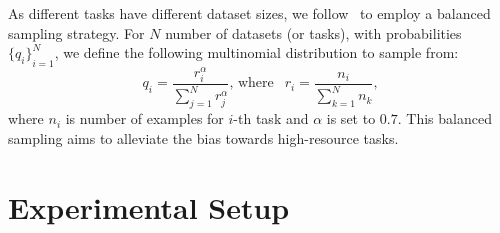 \documentclass[11pt]{article}
\begin{document}
As different tasks have different dataset sizes, we follow~\citet{DBLP:conf/nips/ConneauL19} to employ a balanced sampling strategy. For $N$ number of datasets (or tasks), with probabilities ${\{q_i\}}_{i=1}^{N}$, we define the following multinomial distribution to sample from:
\begin{equation}\label{eq:sample}
q_i=\frac{r^\alpha_i}{\sum^{N}_{j=1}r^\alpha_j} \text{, where }   \ \ r_i=\frac{n_i}{\sum^{N}_{k=1}n_k} \text{,}
\end{equation}
\noindent where $n_i$ is number of examples for $i$-th task and $\alpha$ is set to $0.7$. This balanced sampling aims to alleviate the bias towards high-resource tasks. \section{Experimental Setup}
\begin{table}[!t]
\centering
{}
\vspace{-0.5em}
\caption{Dataset statistics.   ``Identifier'' denotes the proportion of identifiers over all code tokens for each PL. \label{table:data}
}
\vspace{-2em}
\end{table}
\end{document}
